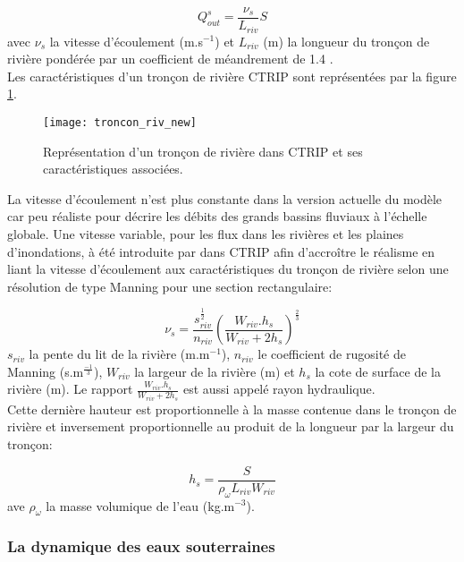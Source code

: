 \begin{equation}
Q_{out}^{s}=\frac{\nu_{s}}{L_{riv}}S
\end{equation}
avec $\nu_{s}$ la vitesse d'écoulement (m.s$^{-1}$) et $L_{riv}$ (m) la longueur du tronçon de rivière pondérée par un coefficient de méandrement de 1.4 \citep{oki1998}.\\

\noindent Les caractéristiques d'un tronçon de rivière CTRIP sont représentées par la figure \ref{troncon_riv}. \\

\begin{figure}[h!]
\centering
\texttt{[image: troncon\_riv\_new]}
\caption{Représentation d'un tronçon de rivière dans CTRIP et ses caractéristiques associées.}
\label{troncon_riv}
\end{figure}

\noindent La vitesse d'écoulement n'est plus constante dans la version actuelle du modèle car peu réaliste pour décrire les débits des grands bassins fluviaux à l'échelle globale. Une vitesse variable, pour les flux dans les rivières et les plaines d'inondations, à été introduite par \citet{decharme2010} dans CTRIP afin d'accroître le réalisme en liant la vitesse d'écoulement aux caractéristiques du tronçon de rivière selon une résolution de type Manning \citep{arora1999} pour une section rectangulaire:

\begin{equation}
\nu_{s} =  \dfrac{s_{riv}^{\frac{1}{2}}}{n_{riv}}\left(\frac{W_{riv}.h_{s}}{W_{riv}+2h_{s}}\right)^{\frac{2}{3}}
\end{equation}
$s_{riv}$ la pente du lit de la rivière (m.m$^{-1}$), $n_{riv}$ le coefficient de rugosité de Manning (s.m$^{\frac{-1}{3}}$), $W_{riv}$ la largeur de la rivière (m) et $h_{s}$ la cote de surface de la rivière (m). 
\noindent Le rapport $\frac{W_{riv}.h_{s}}{W_{riv}+2h_{s}}$ est aussi appelé rayon hydraulique.\\

\noindent Cette dernière hauteur est proportionnelle à la masse contenue dans le tronçon de rivière et inversement proportionnelle au produit de la longueur par la largeur du tronçon:

\begin{equation}
h_{s} = \frac{S}{\rho_{\omega}L_{riv}W_{riv}}
\end{equation}
ave $\rho_{\omega}$ la masse volumique de l'eau (kg.m$^{-3}$).
\subsubsection{\selectfont La dynamique des eaux souterraines}

